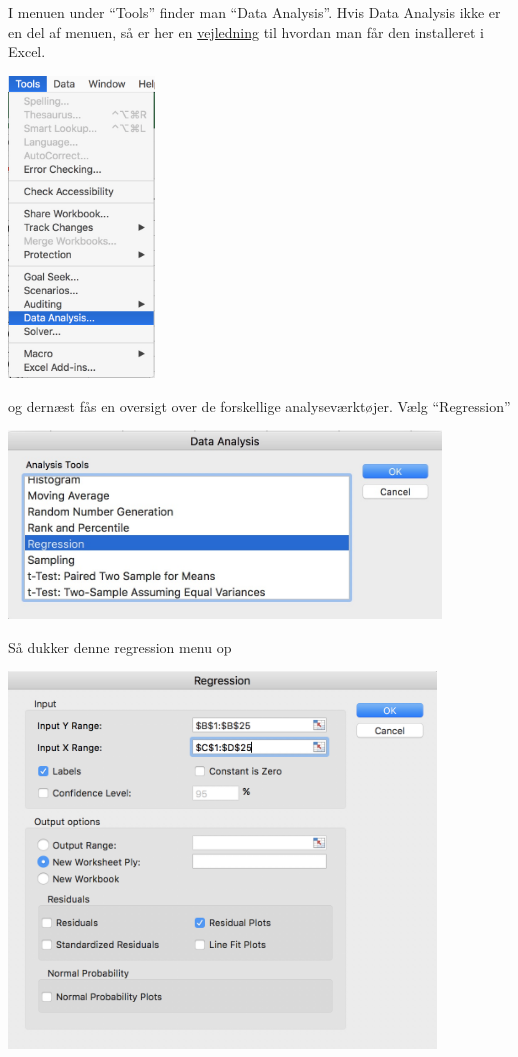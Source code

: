 I menuen under ``Tools'' finder man ``Data Analysis''. Hvis Data Analysis ikke er en del af menuen, så er her en \href{https://support.office.com/en-us/article/Load-the-Analysis-ToolPak-6a63e598-cd6d-42e3-9317-6b40ba1a66b4}{vejledning} til hvordan man får den installeret i Excel.
\begin{center}
\includegraphics[height=8cm]{regression/images/menu.JPG}
\end{center}
og dernæst fås en oversigt over de forskellige analyseværktøjer. Vælg ``Regression''
\begin{center}
\includegraphics[height=5cm]{regression/images/analysisTools.JPG}
\end{center}
Så dukker denne regression menu op
\begin{center}\label{figure:regressionMenu}
\includegraphics[height=10cm]{regression/images/regression.JPG}
\end{center}
